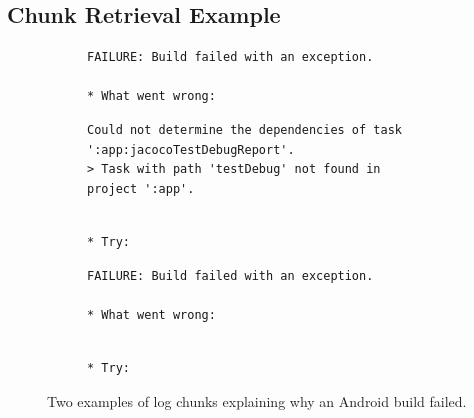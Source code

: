 
\subsection{Chunk Retrieval Example}
\label{seC:crt-example}

\begin{figure}[!htbp]
  \centering
\begin{subfigure}[!htbp]{\columnwidth}
  \begin{lstlisting}[breaklines=true,frame=tlr]
FAILURE: Build failed with an exception.

* What went wrong:
  \end{lstlisting}
  \vspace{-\baselineskip}
  \begin{lstlisting}[backgroundcolor=\color{Cerulean!60},breaklines=true,frame=rl]
Could not determine the dependencies of task ':app:jacocoTestDebugReport'.
> Task with path 'testDebug' not found in project ':app'.
  \end{lstlisting}
  \vspace{-\baselineskip}
  \begin{lstlisting}[breaklines=true,frame=blr]

* Try:
  \end{lstlisting}
\end{subfigure}\hspace{\fill}
\begin{subfigure}[!htbp]{\columnwidth}
  \centering
  \begin{lstlisting}[breaklines=true,frame=tlr]
FAILURE: Build failed with an exception.

* What went wrong:
  \end{lstlisting}
  \vspace{-\baselineskip}
  
  \vspace{-\baselineskip}
  \begin{lstlisting}[breaklines=true,frame=blr]

* Try:
  \end{lstlisting}
\end{subfigure}
  \caption{Two examples of log chunks explaining why an Android
  build failed.}
  \label{lst:chunk-example}
\end{figure}

